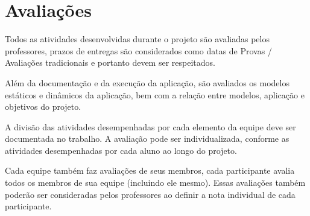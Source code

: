 \section{Avaliações}

Todos as atividades desenvolvidas durante o projeto são avaliadas pelos professores, prazos de entregas são considerados como datas de Provas / Avaliações tradicionais e portanto devem ser respeitados.

Além da documentação e da execução da aplicação, são avaliados os modelos estáticos e dinâmicos da aplicação, bem com a relação entre modelos, aplicação e objetivos do projeto.

A divisão das atividades desempenhadas por cada elemento da equipe deve ser documentada no trabalho. A avaliação pode ser individualizada, conforme as atividades desempenhadas por cada aluno ao longo do projeto.

Cada equipe também faz avaliações de seus membros, cada participante avalia todos os membros de sua equipe (incluindo ele mesmo). Essas avaliações também poderão ser consideradas pelos professores ao definir a nota individual de cada participante.



